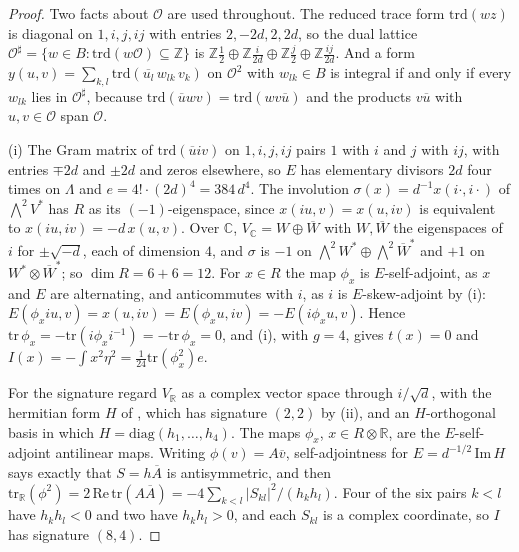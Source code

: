 \documentclass[11pt,reqno]{amsart}
\theoremstyle{plain}
\theoremstyle{definition}
\theoremstyle{remark}
\newcommand{\ZZ}{\mathbb{Z}}
\newcommand{\RR}{\mathbb{R}}
\newcommand{\CC}{\mathbb{C}}
\newcommand{\cO}{\mathcal{O}}
\newcommand{\bbar}[1]{\overline{#1}}
\begin{document}
\begin{proof}
Two facts about $\cO$ are used throughout. The reduced trace form
$\mathrm{trd}(wz)$ is diagonal on $1,i,j,ij$ with entries $2,-2d,2,2d$, so
the dual lattice $\cO^{\sharp}=\{w\in B:\mathrm{trd}(w\cO)\subseteq\ZZ\}$ is
$\ZZ\tfrac12\oplus\ZZ\tfrac{i}{2d}\oplus\ZZ\tfrac{j}{2}\oplus\ZZ\tfrac{ij}{2d}$.
And a form $y(u,v)=\sum_{k,l}\mathrm{trd}(\bbar{u_{l}}\,w_{lk}\,v_{k})$ on
$\cO^{2}$ with $w_{lk}\in B$ is integral if and only if every $w_{lk}$ lies
in $\cO^{\sharp}$, because $\mathrm{trd}(\bbar{u}wv)=\mathrm{trd}(wv\bbar{u})$
and the products $v\bbar{u}$ with $u,v\in\cO$ span $\cO$.

(i) The Gram matrix of $\mathrm{trd}(\bbar{u}iv)$ on $1,i,j,ij$ pairs $1$
with $i$ and $j$ with $ij$, with entries $\mp2d$ and $\pm2d$ and zeros
elsewhere, so $E$ has elementary divisors $2d$ four times on $\Lambda$ and
$e=4!\cdot(2d)^{4}=384\,d^{4}$. The involution $\sigma(x)=d^{-1}x(i\cdot,i\cdot)$
of $\bigwedge^{2}V^{*}$ has $R$ as its $(-1)$-eigenspace, since
$x(iu,v)=x(u,iv)$ is equivalent to $x(iu,iv)=-d\,x(u,v)$. Over $\CC$,
$V_{\CC}=W\oplus\bbar{W}$ with $W,\bbar{W}$ the eigenspaces of $i$ for
$\pm\sqrt{-d}$, each of dimension $4$, and $\sigma$ is $-1$ on
$\bigwedge^{2}W^{*}\oplus\bigwedge^{2}\bbar{W}^{*}$ and $+1$ on
$W^{*}\otimes\bbar{W}^{*}$; so $\dim R=6+6=12$. For $x\in R$ the map
$\phi_{x}$ is $E$-self-adjoint, as $x$ and $E$ are alternating, and
anticommutes with $i$, as $i$ is $E$-skew-adjoint by
(i): $E(\phi_{x}iu,v)=x(u,iv)=E(\phi_{x}u,iv)=-E(i\phi_{x}u,v)$.
Hence $\mathrm{tr}\,\phi_{x}=-\mathrm{tr}(i\phi_{x}i^{-1})=-\mathrm{tr}\,\phi_{x}=0$,
and (i), with $g=4$, gives $t(x)=0$ and
$I(x)=-\int x^{2}\eta^{2}=\tfrac{1}{24}\mathrm{tr}(\phi_{x}^{2})e$.

For the signature regard $V_{\RR}$ as a complex vector space through
$i/\sqrt{d}$, with the hermitian form $H$ of , which has
signature $(2,2)$ by (ii), and an $H$-orthogonal basis in
which $H=\mathrm{diag}(h_{1},\dots,h_{4})$. The maps $\phi_{x}$, $x\in R\otimes\RR$,
are the $E$-self-adjoint antilinear maps. Writing $\phi(v)=A\bbar{v}$,
self-adjointness for $E=d^{-1/2}\,\mathrm{Im}\,H$ says exactly that
$S=h\bbar{A}$ is antisymmetric, and then
$\mathrm{tr}_{\RR}(\phi^{2})=2\,\mathrm{Re}\,\mathrm{tr}(A\bbar{A})
=-4\sum_{k<l}|S_{kl}|^{2}/(h_{k}h_{l})$. Four of the six pairs $k<l$ have
$h_{k}h_{l}<0$ and two have $h_{k}h_{l}>0$, and each $S_{kl}$ is a complex
coordinate, so $I$ has signature $(8,4)$.


\end{proof}
\end{document}
